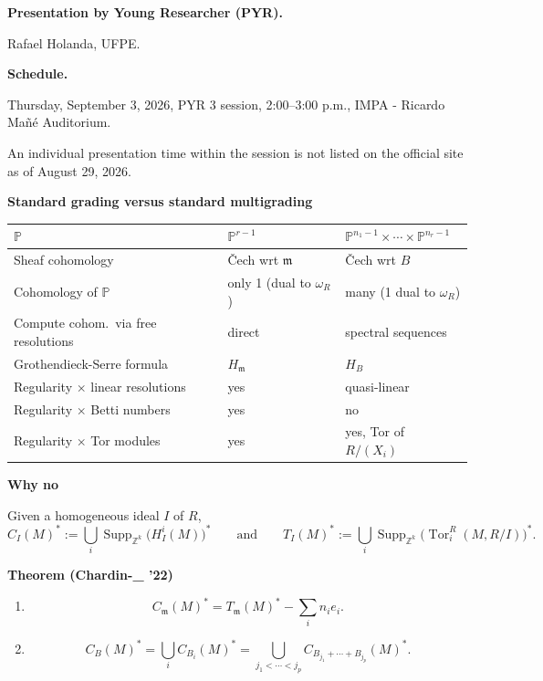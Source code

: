 \medskip\noindent
{\bf Presentation by Young Researcher
(PYR).}

Rafael Holanda,
UFPE.

\medskip\noindent
{\bf Schedule.}

Thursday, September 3, 2026,
PYR 3 session, 2:00--3:00 p.m.,
IMPA - Ricardo Ma\~n\'e Auditorium.

An individual presentation time within
the session is not listed on the
official site as of August 29, 2026.

\medskip\noindent
{\bf Standard grading versus standard
multigrading}

\begin{center}
\small
\begin{tabular}{
|p{}|
p{}|
p{}|}
\hline
$\mathbb{P}$
&
$\mathbb{P}^{r-1}$
&
$\mathbb{P}^{n_1-1}\times\cdots\times
\mathbb{P}^{n_r-1}$
\\ \hline
Sheaf cohomology
&
{\v C}ech wrt $\mathfrak{m}$
&
{\v C}ech wrt $B$
\\ \hline
Cohomology of $\mathbb{P}$
&
only 1 (dual to $\omega_R$)
&
many (1 dual to $\omega_R$)
\\ \hline
Compute cohom.\ via free resolutions
&
direct
&
spectral sequences
\\ \hline
Grothendieck-Serre formula
&
$H_{\mathfrak{m}}$
&
$H_B$
\\ \hline
Regularity $\times$ linear resolutions
&
yes
&
quasi-linear
\\ \hline
Regularity $\times$ Betti numbers
&
yes
&
no
\\ \hline
Regularity $\times$ Tor modules
&
yes
&
yes, Tor of $R/(X_i)$
\\ \hline
\end{tabular}
\end{center}

\medskip\noindent
{\bf Why no}

Given a homogeneous ideal $I$ of $R$,
$$
C_I(M)^*
:=
\bigcup_i
\operatorname{Supp}_{\mathbb{Z}^k}
\bigl(H_I^i(M)\bigr)^*
\qquad\text{and}\qquad
T_I(M)^*
:=
\bigcup_i
\operatorname{Supp}_{\mathbb{Z}^k}
\bigl(\operatorname{Tor}_i^R(M,R/I)\bigr)^*.
$$

\medskip\noindent
{\bf Theorem (Chardin-\_ '22)}

\begin{enumerate}
\item[(1)]
$$
C_{\mathfrak{m}}(M)^*
=
T_{\mathfrak{m}}(M)^*
-
\sum_i n_i e_i.
$$

\item[(2)]
$$
C_B(M)^*
=
\bigcup_i C_{B_i}(M)^*
=
\bigcup_{j_1<\cdots<j_p}
C_{B_{j_1}+\cdots+B_{j_p}}(M)^*.
$$
\end{enumerate}

